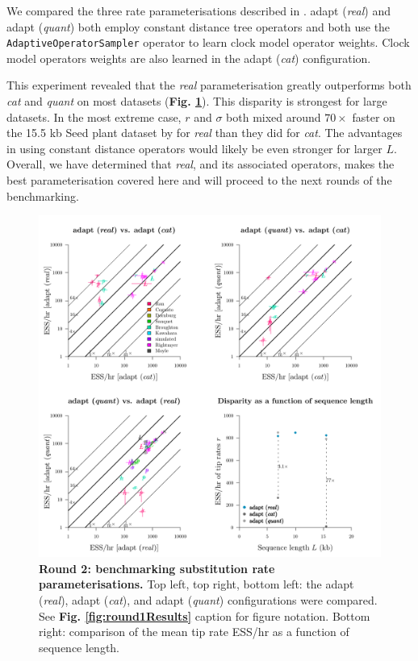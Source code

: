 \documentclass[10pt,letterpaper]{article}
\begin{document}
We compared the three rate parameterisations described in \textbf{}. 
adapt (\textit{real}) and adapt (\textit{quant}) both employ constant distance tree operators \cite{zhang2020improving} and both use the \texttt{AdaptiveOperatorSampler} operator to learn clock model operator weights.
Clock model operators weights are also learned in the adapt (\textit{cat}) configuration.





This experiment revealed that the \textit{real} parameterisation greatly outperforms both \textit{cat} and \textit{quant} on most datasets (\textbf{Fig. \ref{fig:round2Results}}).
This disparity is strongest for large datasets.
In the most extreme case, $r$ and $\sigma$ both mixed around $70 \times$ faster on the 15.5 kb Seed plant dataset by \cite{Ran_2018} for \textit{real} than they did for \textit{cat}.
The advantages in using constant distance operators would likely be even stronger for larger $L$.
Overall, we have determined that \textit{real}, and its associated operators, makes the best parameterisation covered here and will proceed to the next rounds of the benchmarking.



\begin{figure}[!h]
\includegraphics[width=\textwidth]{benchmarking/benchmarkingVM/ESS_round2.pdf}
\caption{\textbf{Round 2: benchmarking substitution rate parameterisations.} Top left, top right, bottom left: the adapt (\textit{real}), adapt (\textit{cat}), and adapt (\textit{quant}) configurations were compared. See \textbf{Fig. \ref{fig:round1Results}} caption for figure notation. Bottom right: comparison of the mean tip rate ESS/hr as a function of sequence length. }
\label{fig:round2Results}
\end{figure}
\end{document}
